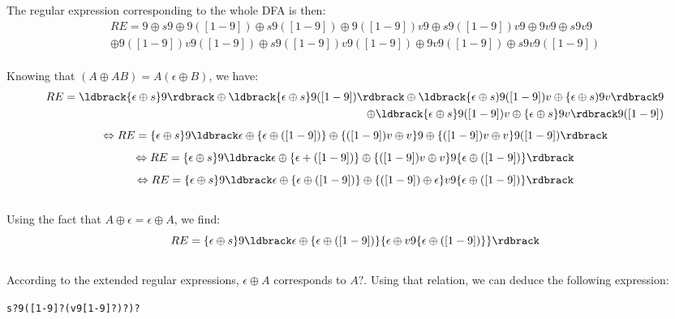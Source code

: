 \documentclass[a4paper,11pt]{article}
\begin{document}
The regular expression corresponding to the whole DFA is then:
\begin{equation}\nonumber
\begin{split}
RE = {9 \oplus s9} \oplus {9([1-9]) \oplus s9([1-9])} \oplus {9([1-9])v9 \oplus s9([1-9])v9 \oplus 9v9 \oplus s9v9} \\
	\oplus {9([1-9])v9([1-9]) \oplus s9([1-9])v9([1-9]) \oplus 9v9([1-9]) \oplus s9v9([1-9])}
\end{split}
\end{equation}
~\\

Knowing that $(A \oplus AB) = A(\epsilon \oplus B)$, we have:
\begin{equation}\nonumber
\begin{split}
	RE = \ldbrack\{\epsilon \oplus s\}9\rdbrack \oplus \ldbrack\{\epsilon \oplus s\}9([1-9])\rdbrack 
	\oplus \ldbrack\{\epsilon \oplus s)9([1-9])v \oplus \{\epsilon \oplus s)9v\rdbrack9 \\
	\oplus \ldbrack\{\epsilon \oplus s\}9([1-9])v \oplus \{\epsilon \oplus s\}9v\rdbrack9([1-9]) \\
\end{split}
\end{equation}
\[\Leftrightarrow RE = \{\epsilon \oplus s\}9 \ldbrack\epsilon \oplus \{\epsilon \oplus ([1-9])\} \oplus \{([1-9])v \oplus v\}9
\oplus \{([1-9])v \oplus v\}9([1-9])\rdbrack\]
\[\Leftrightarrow RE = \{\epsilon \oplus s\}9 \ldbrack\epsilon \oplus \{\epsilon+([1-9])\}
\oplus \{([1-9])v \oplus v\}9\{\epsilon \oplus ([1-9])\}\rdbrack\]
\[\Leftrightarrow RE = \{\epsilon \oplus s\}9 \ldbrack\epsilon \oplus \{\epsilon \oplus ([1-9])\}
\oplus \{([1-9]) \oplus \epsilon\}v9\{\epsilon \oplus ([1-9])\}\rdbrack\]
~\\

Using the fact that $A \oplus \epsilon = \epsilon \oplus A$, we find:
\[ RE = \{\epsilon \oplus s\}9 \ldbrack\epsilon \oplus \{\epsilon \oplus ([1-9])\}
\{\epsilon \oplus v9\{\epsilon \oplus ([1-9])\}\}\rdbrack\]
~\\

According to the extended regular expressions, \texttt{$\epsilon \oplus A$} corresponds to
\texttt{$A?$}. Using that relation, we can deduce the following expression:
\begin{center}
	\texttt{s?9([1-9]?(v9[1-9]?)?)?}
\end{center}


\end{document}
